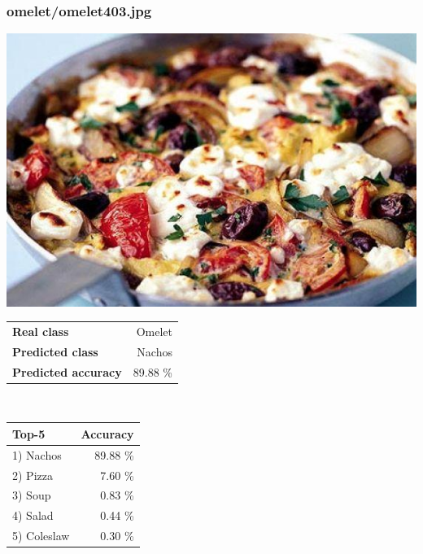 \subsubsection{omelet/omelet403.jpg}

\begin{minipage}[t]{0.4\textwidth}
	\vspace{0pt}
	\includegraphics[width=\linewidth]{images/evaluation-images/omelet/omelet403.jpg}
\end{minipage}
\hfill
\begin{minipage}[t]{0.5\textwidth}
	\vspace{0pt}\raggedright
	\begin{tabularx}{\textwidth}{X r}
		\small \textbf{Real class} & \small Omelet\\
		\small \textbf{Predicted class} & \small Nachos\\
		\small \textbf{Predicted accuracy} & \small 89.88 \%
    \end{tabularx}\\
    
    \vspace{6pt}
	\begin{tabularx}{\textwidth}{X r}
        \small \textbf{Top-5} & \small \textbf{Accuracy} \\
        \hline
		\small 1) Nachos & \small 89.88 \%\\\small 2) Pizza & \small 7.60 \%\\\small 3) Soup & \small 0.83 \%\\\small 4) Salad & \small 0.44 \%\\\small 5) Coleslaw & \small 0.30 \%
    \end{tabularx}
\end{minipage}
    

